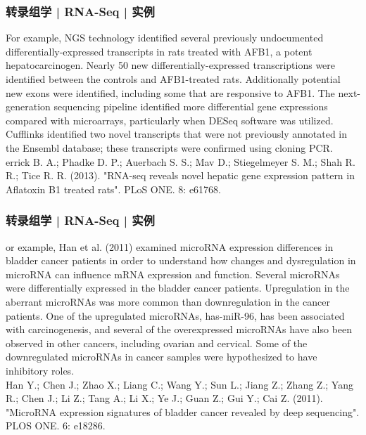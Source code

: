 \begin{frame}
  \frametitle{转录组学 | RNA-Seq | 实例}
  For example, NGS technology identified several previously undocumented differentially-expressed transcripts in rats treated with AFB1, a potent hepatocarcinogen. Nearly 50 new differentially-expressed transcriptions were identified between the controls and AFB1-treated rats. Additionally potential new exons were identified, including some that are responsive to AFB1. The next-generation sequencing pipeline identified more differential gene expressions compared with microarrays, particularly when DESeq software was utilized. Cufflinks identified two novel transcripts that were not previously annotated in the Ensembl database; these transcripts were confirmed using cloning PCR.\\
errick B. A.; Phadke D. P.; Auerbach S. S.; Mav D.; Stiegelmeyer S. M.; Shah R. R.; Tice R. R. (2013). "RNA-seq reveals novel hepatic gene expression pattern in Aflatoxin B1 treated rats". PLoS ONE. 8: e61768. 
\end{frame}

\begin{frame}
  \frametitle{转录组学 | RNA-Seq | 实例}
  or example, Han et al. (2011) examined microRNA expression differences in bladder cancer patients in order to understand how changes and dysregulation in microRNA can influence mRNA expression and function. Several microRNAs were differentially expressed in the bladder cancer patients. Upregulation in the aberrant microRNAs was more common than downregulation in the cancer patients. One of the upregulated microRNAs, has-miR-96, has been associated with carcinogenesis, and several of the overexpressed microRNAs have also been observed in other cancers, including ovarian and cervical. Some of the downregulated microRNAs in cancer samples were hypothesized to have inhibitory roles.\\
Han Y.; Chen J.; Zhao X.; Liang C.; Wang Y.; Sun L.; Jiang Z.; Zhang Z.; Yang R.; Chen J.; Li Z.; Tang A.; Li X.; Ye J.; Guan Z.; Gui Y.; Cai Z. (2011). "MicroRNA expression signatures of bladder cancer revealed by deep sequencing". PLOS ONE. 6: e18286. 
\end{frame}

